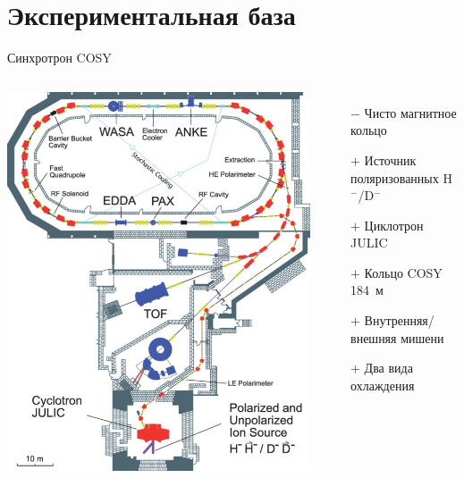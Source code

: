 \documentclass[14pt]{beamer}
\begin{document}
\section{Экспериментальная база}
\begin{frame}{Синхротрон COSY}
	\begin{columns}
		\centering
		\includegraphics[height=.85\paperheight]{COSY_facility}
		\begin{itemize}
			\item[$-$] Чисто магнитное кольцо
			\item[$+$] Источник поляризованных H$^-$/D$^-$
			\item[$+$] Циклотрон JULIC
			\item[$+$] Кольцо COSY 184~м
			\item[$+$] Внутренняя/внешняя мишени
			\item[$+$] Два вида охлаждения
		\end{itemize}
	\end{columns}
	
\end{frame}
\end{document}
